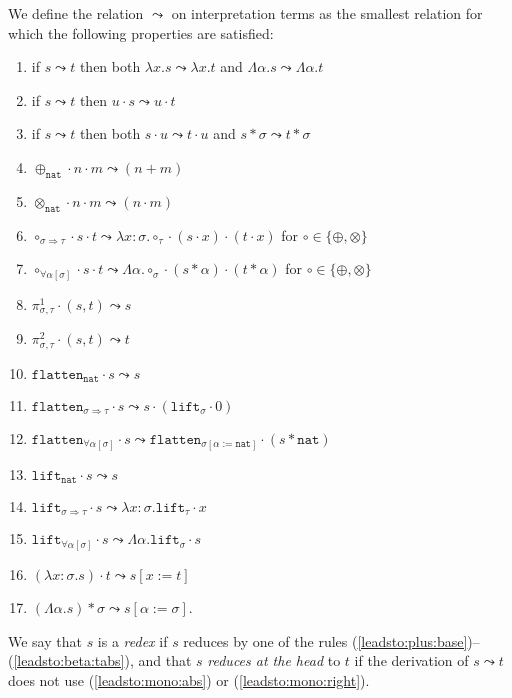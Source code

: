 \documentclass[runningheads,a4paper]{llncs}
\newcommand{\quant}[2]{\forall #1[#2]}
\newcommand{\arrtype}{\Rightarrow}
\newcommand{\abs}[2]{\lambda #1.#2}
\newcommand{\tabs}[2]{\Lambda #1.#2}
\newcommand{\app}[2]{#1 \cdot #2}
\newcommand{\tapp}[2]{#1 * #2}
\newcommand{\subst}[2]{#1:=#2}
\newcommand{\nat}{\mathtt{nat}}
\newcommand{\proj}{\pi}
\newcommand{\flatten}{\mathtt{flatten}}
\newcommand{\lift}{\mathtt{lift}}
\begin{document}
\begin{definition}
We define the relation $\leadsto$ on interpretation terms as the
smallest relation for which the following properties are satisfied:
\begin{enumerate}
\item\label{leadsto:mono:abs}
  if $s \leadsto t$ then both $\abs{x}{s} \leadsto \abs{x}{t}$ and
  $\tabs{\alpha}{s} \leadsto \tabs{\alpha}{t}$
\item\label{leadsto:mono:right}
  if $s \leadsto t$ then $\app{u}{s} \leadsto \app{u}{t}$
\item\label{leadsto:mono:left}
  if $s \leadsto t$ then both $\app{s}{u} \leadsto \app{t}{u}$ and
  $\tapp{s}{\sigma} \leadsto \tapp{t}{\sigma}$
\item\label{leadsto:plus:base}
  $\app{\app{\oplus_{\nat}}{n}}{m} \leadsto (n+m)$ 
\item\label{leadsto:times:base}
  $\app{\app{\otimes_{\nat}}{n}}{m} \leadsto (n \cdot m)$ 
\item\label{leadsto:circ:arrow}
  $\app{\app{\circ_{\sigma \arrtype \tau}}{s}}{t} \leadsto \abs{x:
  \sigma}{\app{\app{\circ_\tau}{(\app{s}{x})}}{(\app{t}{x})}}$ for
  $\circ \in \{ \oplus, \otimes \}$
\item\label{leadsto:circ:forall}
  $\app{\app{\circ_{\quant{\alpha}{\sigma}}}{s}}{t} \leadsto
  \tabs{\alpha}{\app{\app{\circ_\sigma}{(\tapp{s}{\alpha})}}{(
  \tapp{t}{\alpha})}}$ for $\circ \in \{ \oplus, \otimes \}$
\item $\app{\proj^1_{\sigma,\tau}}{(s,t)} \leadsto s$
\item $\app{\proj^2_{\sigma,\tau}}{(s,t)} \leadsto t$
\item $\app{\flatten_\nat}{s} \leadsto s$
\item $\app{\flatten_{\sigma \arrtype \tau}}{s} \leadsto
  \app{s}{(\app{\lift_\sigma}{0})}$
\item $\app{\flatten_{\quant{\alpha}{\sigma}}}{s} \leadsto
  \app{\flatten_{\sigma[\subst{\alpha}{\nat}]}}{(\tapp{s}{\nat})}$
\item $\app{\lift_\nat}{s} \leadsto s$
\item $\app{\lift_{\sigma \arrtype \tau}}{s} \leadsto
  \abs{x:\sigma}{\app{\lift_{\tau}}{x}}$
\item $\app{\lift_{\quant{\alpha}{\sigma}}}{s} \leadsto
  \tabs{\alpha}{\app{\lift_{\sigma}}{s}}$
\item\label{leadsto:beta:abs}
  $\app{(\abs{x:\sigma}{s})}{t} \leadsto s[\subst{x}{t}]$
\item\label{leadsto:beta:tabs}
  $\tapp{(\tabs{\alpha}{s})}{\sigma} \leadsto
  s[\subst{\alpha}{\sigma}]$.
\end{enumerate}
We say that $s$ is a \emph{redex} if $s$ reduces by one of the rules
(\ref{leadsto:plus:base})--(\ref{leadsto:beta:tabs}), and that $s$
\emph{reduces at the head} to $t$ if the derivation of $s \leadsto t$
does not use (\ref{leadsto:mono:abs}) or (\ref{leadsto:mono:right}).


\end{definition}
\end{document}
